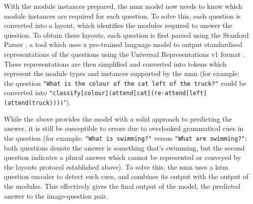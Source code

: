 With the module instances prepared, the \gls{nmn} model now needs to know which module instances are required for each question.
To solve this, each question is converted into a layout, which identifies the modules required to answer the question.
To obtain these layouts, each question is first parsed using the Stanford Parser \cite{klein_accurate_2003}, a tool which uses a pre-trained language model to output standardised representations of the questions using the Universal Representations v1 format \cite{nivre_universal_2016}.
These representations are then simplified and converted into tokens which represent the module types and instances supported by the \gls{nmn} (for example: the question \texttt{"What is the colour of the cat left of the truck?"} could be converted into \texttt{"classify[colour](attend[cat](re-attend[left](attend(truck))))}").

While the above provides the model with a solid approach to predicting the answer, it is still be susceptible to errors due to overlooked grammatical cues in the question (for example: \texttt{"What is swimming?"} versus \texttt{"What are swimming?"}; both questions denote the answer is something that's swimming, but the second question indicates a plural answer which cannot be represented or conveyed by the layouts protocol established above).
To solve this, the \gls{nmn} uses a \acrlong{lstm} question encoder to detect such cues, and combines its output with the output of the modules.
This effectively gives the final output of the model, the predicted answer to the image-question pair.

